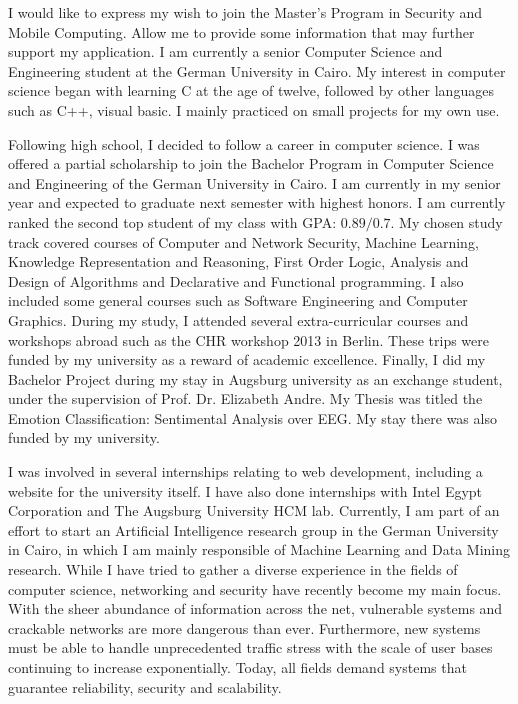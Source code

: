 \documentclass[10pt,stdletter,dateno,sigleft]{newlfm} %
\begin{document}
\begin{newlfm}


I would like to express my wish to join the Master's Program in Security and Mobile Computing. Allow me to provide some information that may further support my application.  I am currently a senior Computer Science and Engineering student at the German University in Cairo.  My interest in computer science began with learning C at the age of twelve, followed by other languages such as C++, visual basic. I mainly practiced on small projects for my own use.  

Following high school, I decided to follow a career in computer science. I was offered a partial scholarship to join the Bachelor Program in Computer Science and Engineering of the German University in Cairo. I am currently in my senior year and expected to graduate next semester with highest honors. I am currently ranked the second top student of my class with GPA: $0.89/0.7$. My chosen study track covered courses of Computer and Network Security, Machine Learning, Knowledge Representation and Reasoning, First Order Logic, Analysis and Design of Algorithms and Declarative and Functional programming. I also included some general courses such as Software Engineering and Computer Graphics. During my study, I attended several extra-curricular courses and workshops abroad such as the CHR workshop 2013 in Berlin. These trips were funded by my university as a reward of academic excellence. Finally, I did my Bachelor Project during my stay in Augsburg university as an exchange student, under the supervision of Prof. Dr. Elizabeth Andre. My Thesis was titled the Emotion Classification: Sentimental Analysis over EEG. My stay there was also funded by my university.

I was involved in several internships relating to web development, including a website for the university itself. I have also done internships with Intel Egypt Corporation and The Augsburg University HCM lab. Currently, I am part of an effort to start an Artificial Intelligence research group in the German University in Cairo, in which I am mainly responsible of Machine Learning and Data Mining research. While I have tried to gather a diverse experience in the fields of computer science, networking and security have recently become my main focus. With the sheer abundance of information across the net, vulnerable systems and crackable networks are more dangerous than ever. Furthermore, new systems must be able to handle unprecedented traffic stress with the scale of user bases continuing to increase exponentially. Today, all fields demand systems that guarantee reliability, security and scalability. 


\end{newlfm}
\end{document}
